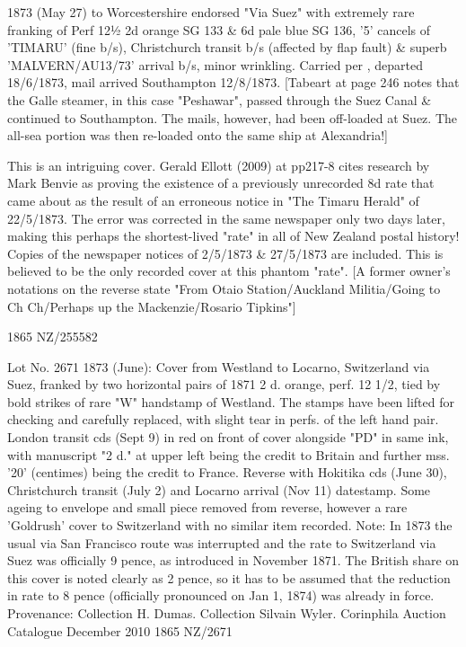 \documentclass[justified]{tufte-book}
\begin{document}
%
{1873 (May 27) to Worcestershire endorsed "Via Suez" with extremely rare franking of Perf 12½ 2d orange SG 133 \& 6d pale blue SG 136, '5' cancels of 'TIMARU' (fine b/s), Christchurch transit b/s (affected by flap fault) \& superb 'MALVERN/AU13/73' arrival b/s, minor wrinkling. Carried per , departed 18/6/1873, mail arrived Southampton 12/8/1873. [Tabeart at page 246 notes that the Galle steamer, in this case "Peshawar", passed through the Suez Canal \& continued to Southampton. The mails, however, had been off-loaded at Suez. The all-sea portion was then re-loaded onto the same ship at Alexandria!]

This is an intriguing cover. Gerald Ellott (2009) at pp217-8 cites research by Mark Benvie as proving the existence of a previously unrecorded 8d rate that came about as the result of an erroneous notice in "The Timaru Herald" of 22/5/1873. The error was corrected in the same newspaper only two days later, making this perhaps the shortest-lived "rate" in all of New Zealand postal history! Copies of the newspaper notices of 2/5/1873 \& 27/5/1873 are included. This is believed to be the only recorded cover at this phantom "rate". [A former owner's notations on the reverse state "From Otaio Station/Auckland Militia/Going to Ch Ch/Perhaps up the Mackenzie/Rosario Tipkins"]}%
{1865}%
{NZ/255582}%
{}%
{}
{}%
{}%

%
{Lot No. 2671
1873 (June): Cover from Westland to Locarno, Switzerland via Suez, franked by two horizontal pairs of 1871 2 d. orange, perf. 12 1/2, tied by bold strikes of rare "W" handstamp of Westland. The stamps have been lifted for checking and carefully replaced, with slight tear in perfs. of the left hand pair. London transit cds (Sept 9) in red on front of cover alongside "PD" in same ink, with manuscript "2 d." at upper left being the credit to Britain and further mss. '20' (centimes) being the credit to France. Reverse with Hokitika cds (June 30), Christchurch transit (July 2) and Locarno arrival (Nov 11) datestamp. Some ageing to envelope and small piece removed from reverse, however a rare 'Goldrush' cover to Switzerland with no similar item recorded. Note: In 1873 the usual via San Francisco route was interrupted and the rate to Switzerland via Suez was officially 9 pence, as introduced in November 1871. The British share on this cover is noted clearly as 2 pence, so it has to be assumed that the reduction in rate to 8 pence (officially pronounced on Jan 1, 1874) was already in force. Provenance: Collection H. Dumas. Collection Silvain Wyler. 
Corinphila Auction Catalogue December 2010 }%
{1865}%
{NZ/2671}%
{}%
{}
{}%
{}%
\end{document}
